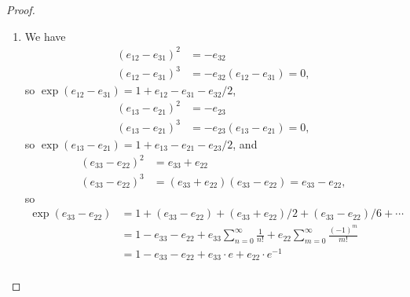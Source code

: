 \documentclass[12pt]{article}
\theoremstyle{definition}
\begin{document}
\begin{proof}
\begin{enumerate}[label=(\alph*)]
		\item We have \begin{align*}
			      (e_{12}-e_{31})^2 & = -e_{32}                     \\
			      (e_{12}-e_{31})^3 & = -e_{32}(e_{12}-e_{31}) = 0,
		      \end{align*}
		      so $\exp(e_{12}-e_{31}) = 1 + e_{12} - e_{31} - e_{32}/2$, \begin{align*}
			      (e_{13} - e_{21})^2 & = -e_{23}                     \\
			      (e_{13} - e_{21})^3 & = -e_{23}(e_{13}-e_{21}) = 0,
		      \end{align*}
		      so $\exp(e_{13} - e_{21}) = 1 + e_{13} - e_{21} - e_{23}/2$, and \begin{align*}
			      (e_{33} - e_{22})^2 & = e_{33} + e_{22}                                       \\
			      (e_{33} - e_{22})^3 & = (e_{33} + e_{22})(e_{33} - e_{22}) = e_{33} - e_{22},
		      \end{align*}
		      so \begin{align*}
			      \exp(e_{33} - e_{22}) & = 1 + (e_{33} - e_{22}) + (e_{33} + e_{22})/2 + (e_{33} - e_{22})/6 + \cdots                                                                       \\
			                            & = 1 - e_{33} - e_{22} + e_{33}\sum_{n=0}^\infty \frac{1}{n!} + e_{22}\sum_{m=0}^\infty \frac{(-1)^m}{m!}                                           \\
			                            & = 1 - e_{33} - e_{22} + e_{33}\cdot e + e_{22} \cdot e^{-1}                                                                                        \\

\end{align*}
\end{enumerate}
\end{proof}
\end{document}
